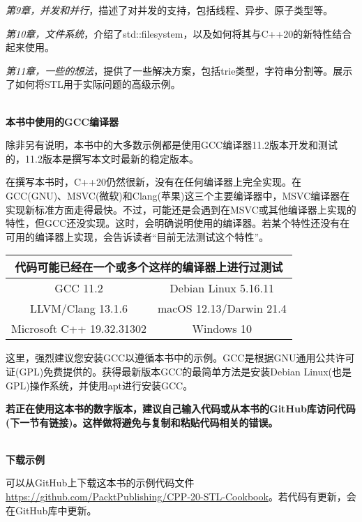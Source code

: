 \textit{第9章，并发和并行}，描述了对并发的支持，包括线程、异步、原子类型等。

\textit{第10章，文件系统}，介绍了std::filesystem，以及如何将其与C++20的新特性结合起来使用。

\textit{第11章，一些的想法}，提供了一些解决方案，包括trie类型，字符串分割等。展示了如何将STL用于实际问题的高级示例。

\hspace*{\fill} \\ %
\noindent
\textbf{本书中使用的GCC编译器}

除非另有说明，本书中的大多数示例都是使用GCC编译器11.2版本开发和测试的，11.2版本是撰写本文时最新的稳定版本。

在撰写本书时，C++20仍然很新，没有在任何编译器上完全实现。在GCC(GNU)、MSVC(微软)和Clang(苹果)这三个主要编译器中，MSVC编译器在实现新标准方面走得最快。不过，可能还是会遇到在MSVC或其他编译器上实现的特性，但GCC还没实现。这时，会明确说明使用的编译器。若某个特性还没有在可用的编译器上实现，会告诉读者“目前无法测试这个特性”。

\begin{table}[H]
\centering
\begin{tabular}{|cc|}
\hline
\multicolumn{2}{|c|}{代码可能已经在一个或多个这样的编译器上进行过测试} \\ \hline
\multicolumn{1}{|c|}{GCC 11.2}                  & Debian Linux 5.16.11    \\ \hline
\multicolumn{1}{|c|}{LLVM/Clang 13.1.6}         & macOS 12.13/Darwin 21.4 \\ \hline
\multicolumn{1}{|c|}{Microsoft C++ 19.32.31302} & Windows 10              \\ \hline
\end{tabular}
\end{table}

这里，强烈建议您安装GCC以遵循本书中的示例。GCC是根据GNU通用公共许可证(GPL)免费提供的。获得最新版本GCC的最简单方法是安装Debian Linux(也是GPL)操作系统，并使用apt进行安装GCC。

\textbf{若正在使用这本书的数字版本，建议自己输入代码或从本书的GitHub库访问代码(下一节有链接)。这样做将避免与复制和粘贴代码相关的错误。}

\hspace*{\fill} \\ %
\noindent
\textbf{下载示例}

可以从GitHub上下载这本书的示例代码文件\url{https://github.com/PacktPublishing/CPP-20-STL-Cookbook}。若代码有更新，会在GitHub库中更新。



















